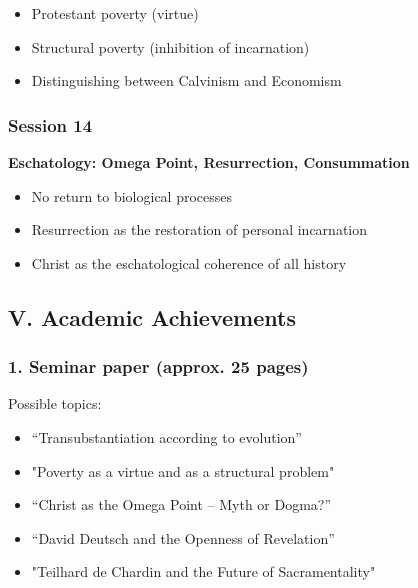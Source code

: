 \documentclass[
]{article}
\begin{document}
\begin{itemize}
\item
  Protestant poverty (virtue)
\item
  Structural poverty (inhibition of incarnation)
\item
  Distinguishing between Calvinism and Economism
\end{itemize}

\subsubsection{\texorpdfstring{\textbf{Session 14}}{Session 14}}\label{session-14}

\textbf{Eschatology: Omega Point, Resurrection, Consummation}

\begin{itemize}
\item
  No return to biological processes
\item
  Resurrection as the restoration of personal incarnation
\item
  Christ as the eschatological coherence of all history
\end{itemize}

\subsection{\texorpdfstring{\textbf{V. Academic Achievements}}{V. Academic Achievements}}\label{v.-academic-achievements}

\subsubsection{\texorpdfstring{\textbf{1. Seminar paper (approx. 25 pages)}}{1. Seminar paper (approx. 25 pages)}}\label{seminar-paper-approx.-25-pages}

Possible topics:

\begin{itemize}
\item
  ``Transubstantiation according to evolution''
\item
  "Poverty as a virtue and as a structural problem"
\item
  ``Christ as the Omega Point -- Myth or Dogma?''
\item
  ``David Deutsch and the Openness of Revelation''
\item
  "Teilhard de Chardin and the Future of Sacramentality"
\end{itemize}
\end{document}

